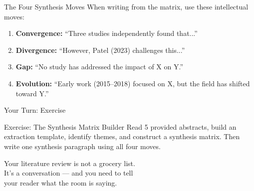 \documentclass[aspectratio=169]{beamer}
\begin{document}
\begin{frame}{The Four Synthesis Moves}
  When writing from the matrix, use these intellectual moves:
  \vspace{0.3cm}
  \begin{enumerate}
    \item \textbf{Convergence:} ``Three studies independently found that...''
    \item \textbf{Divergence:} ``However, Patel (2023) challenges this...''
    \item \textbf{Gap:} ``No study has addressed the impact of X on Y.''
    \item \textbf{Evolution:} ``Early work (2015--2018) focused on X, but the field has shifted toward Y.''
  \end{enumerate}
\end{frame}

\begin{frame}{Your Turn: Exercise}
  \begin{exampleblock}{Exercise: The Synthesis Matrix Builder}
    Read 5 provided abstracts, build an extraction template, identify themes, and construct a synthesis matrix. Then write one synthesis paragraph using all four moves.
  \end{exampleblock}
\end{frame}

\begin{frame}[standout]
  Your literature review is not a grocery list.\\
  It's a conversation --- and you need to tell\\
  your reader what the room is saying.
\end{frame}
\end{document}
